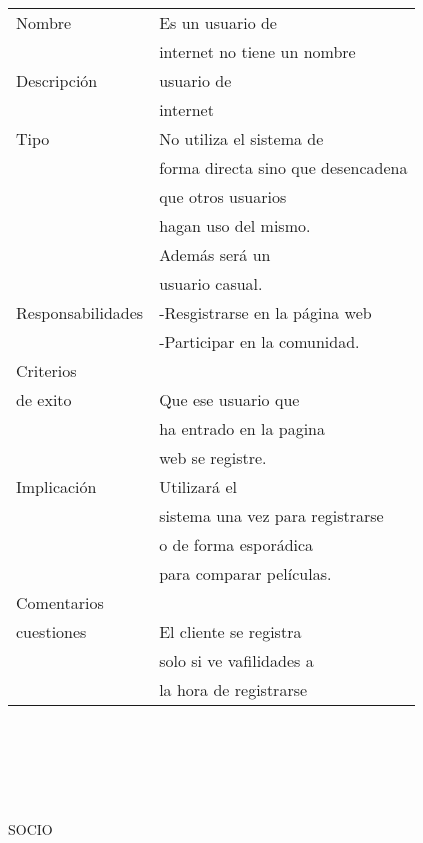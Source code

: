\documentclass{article}
\begin{document}
\begin{tabular}{||l | l ||}
\hline
\hline
Nombre & Es un usuario de \\& internet no tiene un nombre \\
\hline
Descripción & usuario de \\& internet\\
\hline
Tipo & No utiliza el sistema de \\& forma directa sino que desencadena \\& que otros usuarios \\& hagan uso del mismo.\\& Además será un \\& usuario casual. \\
\hline
Responsabilidades & -Resgistrarse en la página web \\& -Participar en la comunidad. \\
\hline
Criterios \\ de exito & Que ese usuario que \\&ha entrado en la pagina \\&web se registre. \\
\hline
Implicación & Utilizará el \\&sistema una vez para registrarse\\& o de forma esporádica\\& para comparar películas. \\
\hline
Comentarios \\ cuestiones & El cliente se registra \\&solo si ve vafilidades a \\& la hora de registrarse \\
\hline
\hline
\end{tabular}
\\ \\ \\ \\ \\
SOCIO
\\ \\
\end{document}
